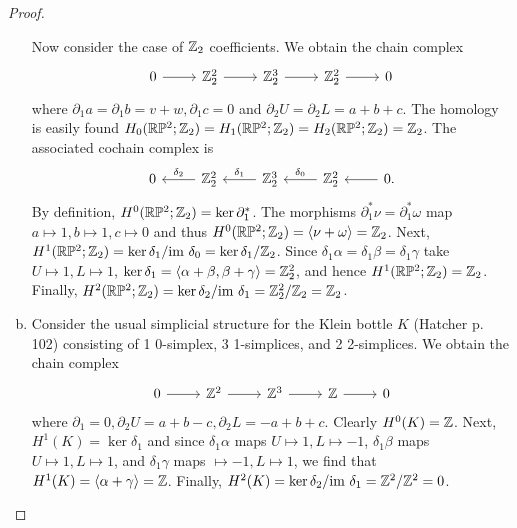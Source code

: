 \documentclass{../../mathnotes}
\begin{document}
\begin{proof}
\begin{enumerate}[(a)]
            Now consider the case of $\mathbb{Z}_2$ coefficients. We obtain the chain complex
            \begin{equation*}
                \begin{tikzcd}
                    0\ar{r} & \Z_2^2\ar{r} & \Z_2^3\ar{r} & \Z_2^2\ar{r} & 0
                \end{tikzcd}
            \end{equation*}
            where $\partial_1a=\partial_1b=v+w,\partial_1c=0$ and $\partial_2U=\partial_2L=a+b+c$. The homology is easily
            found $H_0(\mathbb{R}\mathbb{P}^2;\mathbb{Z}_2)=H_1(\mathbb{R}\mathbb{P}^2;\mathbb{Z}_2)=H_2(\mathbb{R}\mathbb{P}^2;\mathbb{Z}_2)=\mathbb{Z}_2$. The associated cochain complex is
            \begin{equation*}
                \begin{tikzcd}
                    0 & \Z_2^2\ar[swap]{l}{\delta_2} & \Z_2^3\ar[swap]{l}{\delta_1} & \Z_2^2\ar[swap]{l}{\delta_0} & 0\ar{l}.
                \end{tikzcd}
            \end{equation*}
            By definition, $H^0(\mathbb{R}\mathbb{P}^2;\mathbb{Z}_2)=\ker\partial_1^*$. The morphisms $\partial_1^*\nu=\partial_1^*\omega$ map
            $a\mapsto 1,b\mapsto 1,c\mapsto 0$ and thus $H^0(\mathbb{R}\mathbb{P}^2;\mathbb{Z}_2)=\langle\nu+\omega\rangle=\mathbb{Z}_2$. Next,
            $H^1(\mathbb{R}\mathbb{P}^2;\mathbb{Z}_2)=\ker\delta_1/\text{im }\delta_0=\ker\delta_1/\mathbb{Z}_2$. Since $\delta_1\alpha=\delta_1\beta=\delta_1\gamma$
            take $U\mapsto 1,L\mapsto 1$, $\ker\delta_1=\langle\alpha+\beta,\beta+\gamma\rangle=\mathbb{Z}_2^2$, and hence
            $H^1(\mathbb{R}\mathbb{P}^2;\mathbb{Z}_2)=\mathbb{Z}_2$. Finally, $H^2(\mathbb{R}\mathbb{P}^2;\mathbb{Z}_2)=\ker\delta_2/\text{im }\delta_1=\mathbb{Z}_2^2/\mathbb{Z}_2=\mathbb{Z}_2$.
        \item Consider the usual simplicial structure for the Klein bottle $K$ (Hatcher p.~ 102) consisting
            of 1 0-simplex, 3 1-simplices, and 2 2-simplices. We obtain the chain complex
            \begin{equation*}
                \begin{tikzcd}
                    0\ar{r} & \Z^2\ar{r} & \Z^3\ar{r} & \Z\ar{r} & 0
                \end{tikzcd}
            \end{equation*}
            where $\partial_1=0,\partial_2U=a+b-c,\partial_2L=-a+b+c$. Clearly $H^0(K)=\mathbb{Z}$. Next, $H^1(K)=\ker\delta_1$ and since
            $\delta_1\alpha$ maps $U\mapsto 1,L\mapsto -1$, $\delta_1\beta$ maps $U\mapsto 1,L\mapsto 1$, and $\delta_1\gamma$ maps
            $\mapsto -1,L\mapsto 1$, we find that $H^1(K)=\langle \alpha+\gamma\rangle=\mathbb{Z}$. Finally, $H^2(K)=\ker\delta_2/\text{im }\delta_1=\mathbb{Z}^2/\mathbb{Z}^2=0$.


\end{enumerate}
\end{proof}
\end{document}
